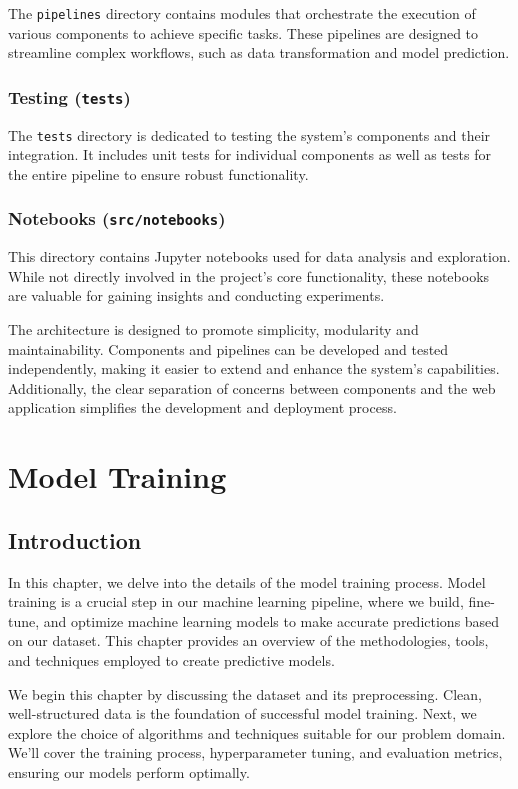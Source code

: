 \documentclass{report}
\begin{document}
The \texttt{pipelines} directory contains modules that orchestrate the execution of various components to achieve specific tasks. These pipelines are designed to streamline complex workflows, such as data transformation and model prediction.

\subsection{Testing (\texttt{tests})}

The \texttt{tests} directory is dedicated to testing the system's components and their integration. It includes unit tests for individual components as well as tests for the entire pipeline to ensure robust functionality.

\subsection{Notebooks (\texttt{src/notebooks})}

This directory contains Jupyter notebooks used for data analysis and exploration. While not directly involved in the project's core functionality, these notebooks are valuable for gaining insights and conducting experiments.

The architecture is designed to promote simplicity, modularity and maintainability. Components and pipelines can be developed and tested independently, making it easier to extend and enhance the system's capabilities. Additionally, the clear separation of concerns between components and the web application simplifies the development and deployment process.
\chapter{Model Training}
\section{Introduction}

In this chapter, we delve into the details of the model training process. Model training is a crucial step in our machine learning pipeline, where we build, fine-tune, and optimize machine learning models to make accurate predictions based on our dataset. This chapter provides an overview of the methodologies, tools, and techniques employed to create predictive models.

We begin this chapter by discussing the dataset and its preprocessing. Clean, well-structured data is the foundation of successful model training. Next, we explore the choice of algorithms and techniques suitable for our problem domain. We'll cover the training process, hyperparameter tuning, and evaluation metrics, ensuring our models perform optimally.
\end{document}
